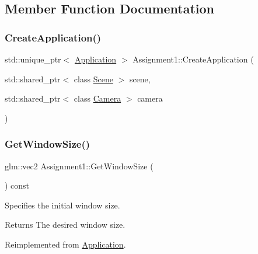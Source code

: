 \subsection{Member Function Documentation}
\hypertarget{class_assignment1_ae1952b4904620a16c4f2c098bf061c68}{}\label{class_assignment1_ae1952b4904620a16c4f2c098bf061c68}
\subsubsection{\texorpdfstring{Create\+Application()}{CreateApplication()}}
{\footnotesize\ttfamily std\+::unique\+\_\+ptr$<$ \hyperlink{class_application}{Application} $>$ Assignment1\+::\+Create\+Application (\begin{DoxyParamCaption}\item[{std\+::shared\+\_\+ptr$<$ class \hyperlink{class_scene}{Scene} $>$}]{scene,  }\item[{std\+::shared\+\_\+ptr$<$ class \hyperlink{class_camera}{Camera} $>$}]{camera }\end{DoxyParamCaption})\hspace{0.3cm}{\ttfamily [static]}}

\hypertarget{class_assignment1_a581b6c897c918eede3f9bbb1cbc50320}{}\label{class_assignment1_a581b6c897c918eede3f9bbb1cbc50320}
\subsubsection{\texorpdfstring{Get\+Window\+Size()}{GetWindowSize()}}
{\footnotesize\ttfamily glm\+::vec2 Assignment1\+::\+Get\+Window\+Size (\begin{DoxyParamCaption}{ }\end{DoxyParamCaption}) const\hspace{0.3cm}{\ttfamily [virtual]}}



Specifies the initial window size.

\begin{DoxyReturn}{Returns}
The desired window size.
\end{DoxyReturn}


Reimplemented from \hyperlink{class_application_ab190ae0e987fe95682714dd4b2495e82}{Application}.

